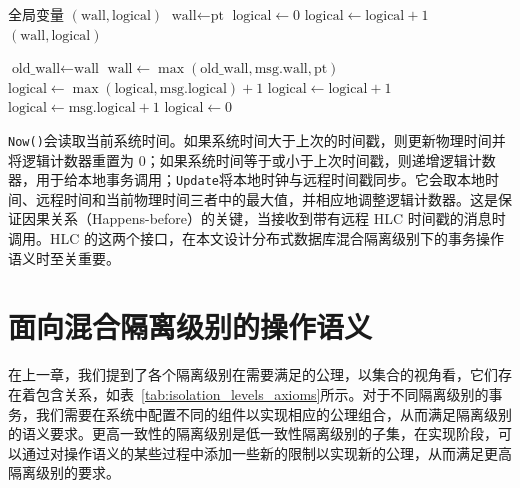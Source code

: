 \begin{algorithm}[htbp]
  \caption{混合逻辑时钟管理}
  \label{algo:hlc}
  \begin{algorithmic}[1]
    \Require 全局变量 $(\text{wall}, \text{logical})$ 
    \State $\text{wall} \gets \text{pt}$
    \State $\text{logical} \gets 0$
    \Else
    \State $\text{logical} \gets \text{logical} + 1$
    \EndIf
    \State \Return $(\text{wall}, \text{logical})$
    \EndProcedure

    \State $\text{old\_wall} \gets \text{wall}$
    \State $\text{wall} \gets \max(\text{old\_wall}, \text{msg.wall}, \text{pt})$
    \State $\text{logical} \gets \max(\text{logical}, \text{msg.logical}) + 1$
    \State $\text{logical} \gets \text{logical} + 1$
    \State $\text{logical} \gets \text{msg.logical} + 1$
    \Else
    \State $\text{logical} \gets 0$
    \EndIf
    \EndProcedure
  \end{algorithmic}
\end{algorithm}

\lstinline|Now()|会读取当前系统时间。如果系统时间大于上次的时间戳，则更新物理时间并将逻辑计数器重置为 0；如果系统时间等于或小于上次时间戳，则递增逻辑计数器，用于给本地事务调用；\lstinline|Update|将本地时钟与远程时间戳同步。它会取本地时间、远程时间和当前物理时间三者中的最大值，并相应地调整逻辑计数器。这是保证因果关系（Happens-before）的关键，当接收到带有远程 HLC 时间戳的消息时调用。HLC 的这两个接口，在本文设计分布式数据库混合隔离级别下的事务操作语义时至关重要。


\section{面向混合隔离级别的操作语义}
在上一章，我们提到了各个隔离级别在需要满足的公理，以集合的视角看，它们存在着包含关系，如表~\ref{tab:isolation_levels_axioms}所示。对于不同隔离级别的事务，我们需要在系统中配置不同的组件以实现相应的公理组合，从而满足隔离级别的语义要求。更高一致性的隔离级别是低一致性隔离级别的子集，在实现阶段，可以通过对操作语义的某些过程中添加一些新的限制以实现新的公理，从而满足更高隔离级别的要求。

